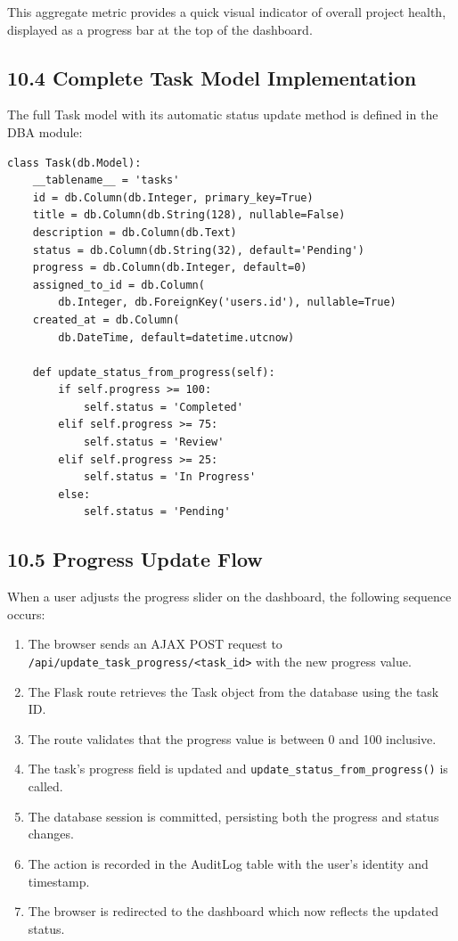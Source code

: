 ﻿\documentclass[12pt]{article}
\begin{document}
This aggregate metric provides a quick visual indicator of overall project health, displayed as a progress bar at the top of the dashboard.

\subsection*{10.4 Complete Task Model Implementation}
The full Task model with its automatic status update method is defined in the DBA module:

\begin{lstlisting}[style=pycode]
class Task(db.Model):
    __tablename__ = 'tasks'
    id = db.Column(db.Integer, primary_key=True)
    title = db.Column(db.String(128), nullable=False)
    description = db.Column(db.Text)
    status = db.Column(db.String(32), default='Pending')
    progress = db.Column(db.Integer, default=0)
    assigned_to_id = db.Column(
        db.Integer, db.ForeignKey('users.id'), nullable=True)
    created_at = db.Column(
        db.DateTime, default=datetime.utcnow)

    def update_status_from_progress(self):
        if self.progress >= 100:
            self.status = 'Completed'
        elif self.progress >= 75:
            self.status = 'Review'
        elif self.progress >= 25:
            self.status = 'In Progress'
        else:
            self.status = 'Pending'
\end{lstlisting}

\subsection*{10.5 Progress Update Flow}
When a user adjusts the progress slider on the dashboard, the following sequence occurs:
\begin{enumerate}
\item The browser sends an AJAX POST request to \texttt{/api/update\_task\_progress/<task\_id>} with the new progress value.
\item The Flask route retrieves the Task object from the database using the task ID.
\item The route validates that the progress value is between 0 and 100 inclusive.
\item The task's progress field is updated and \texttt{update\_status\_from\_progress()} is called.
\item The database session is committed, persisting both the progress and status changes.
\item The action is recorded in the AuditLog table with the user's identity and timestamp.
\item The browser is redirected to the dashboard which now reflects the updated status.
\end{enumerate}
\end{document}
